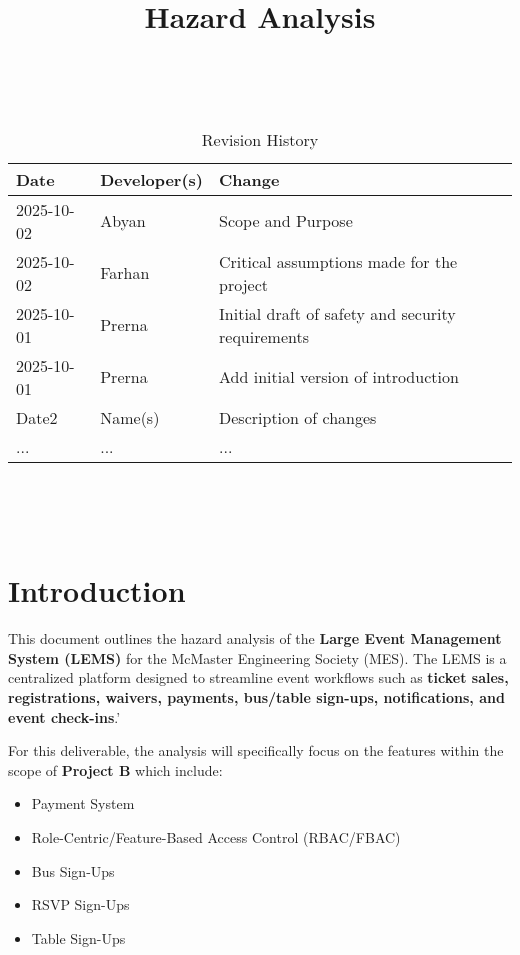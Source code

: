 \documentclass{article}
\title{Hazard Analysis\\\progname}
\author{\authname}
\date{}
\begin{document}
\maketitle
\thispagestyle{empty}

~\newpage


\begin{table}[hp]
\caption{Revision History} \label{TblRevisionHistory}
\begin{tabularx}{\textwidth}{llX}
\toprule
\textbf{Date} & \textbf{Developer(s)} & \textbf{Change}\\
\midrule
2025-10-02 & Abyan & Scope and Purpose\\
2025-10-02 & Farhan & Critical assumptions made for the project\\
2025-10-01 & Prerna & Initial draft of safety and security requirements\\
2025-10-01 & Prerna & Add initial version of introduction\\
Date2 & Name(s) & Description of changes\\
... & ... & ...\\
\bottomrule
\end{tabularx}
\end{table}

~\newpage

\tableofcontents

~\newpage



\section{Introduction}

This document outlines the hazard analysis of the \textbf{Large Event Management System (LEMS)} for the McMaster
Engineering Society (MES). The LEMS is a centralized platform designed to streamline event workflows such as
 \textbf{ticket sales, registrations, waivers, payments, bus/table sign-ups, notifications, and event check-ins}.'
\newline

\noindent
For this deliverable, the analysis will specifically focus on the features within the scope of \textbf{Project B} which include:

\begin{itemize}
    \item Payment System
    \item Role-Centric/Feature-Based Access Control (RBAC/FBAC)
    \item Bus Sign-Ups
    \item RSVP Sign-Ups
    \item Table Sign-Ups
\end{itemize}
\end{document}
